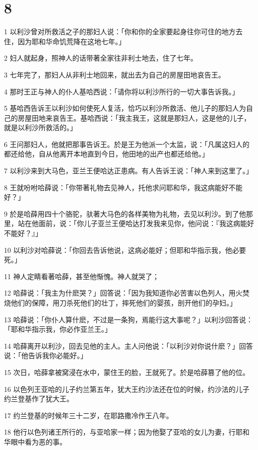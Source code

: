 \chapter{8}

\par 1 以利沙曾对所救活之子的那妇人说：「你和你的全家要起身往你可住的地方去住，因为耶和华命饥荒降在这地七年。」
\par 2 妇人就起身，照神人的话带著全家往非利士地去，住了七年。
\par 3 七年完了，那妇人从非利士地回来，就出去为自己的房屋田地哀告王。
\par 4 那时王正与神人的仆人基哈西说：「请你将以利沙所行的一切大事告诉我。」
\par 5 基哈西告诉王以利沙如何使死人复活，恰巧以利沙所救活、他儿子的那妇人为自己的房屋田地来哀告王。基哈西说：「我主我王，这就是那妇人，这是他的儿子，就是以利沙所救活的。」
\par 6 王问那妇人，他就把那事告诉王。於是王为他派一个太监，说：「凡属这妇人的都还给他，自从他离开本地直到今日，他田地的出产也都还给他。」
\par 7 以利沙来到大马色，亚兰王便哈达正患病。有人告诉王说：「神人来到这里了。」
\par 8 王就吩咐哈薛说：「你带著礼物去见神人，托他求问耶和华，我这病能好不能好？」
\par 9 於是哈薛用四十个骆驼，驮著大马色的各样美物为礼物，去见以利沙。到了他那里，站在他面前，说：「你儿子亚兰王便哈达打发我来见你，他问说：『我这病能好不能好？』」
\par 10 以利沙对哈薛说：「你回去告诉他说，这病必能好；但耶和华指示我，他必要死。」
\par 11 神人定睛看著哈薛，甚至他惭愧。神人就哭了；
\par 12 哈薛说：「我主为什麽哭？」回答说：「因为我知道你必苦害以色列人，用火焚烧他们的保障，用刀杀死他们的壮丁，摔死他们的婴孩，剖开他们的孕妇。」
\par 13 哈薛说：「你仆人算什麽，不过是一条狗，焉能行这大事呢？」以利沙回答说：「耶和华指示我，你必作亚兰王。」
\par 14 哈薛离开以利沙，回去见他的主人。主人问他说：「以利沙对你说什麽？」回答说：「他告诉我你必能好。」
\par 15 次日，哈薛拿被窝浸在水中，蒙住王的脸，王就死了。於是哈薛篡了他的位。
\par 16 以色列王亚哈的儿子约兰第五年，犹大王约沙法还在位的时候，约沙法的儿子约兰登基作了犹大王。
\par 17 约兰登基的时候年三十二岁，在耶路撒冷作王八年。
\par 18 他行以色列诸王所行的，与亚哈家一样；因为他娶了亚哈的女儿为妻，行耶和华眼中看为恶的事。
